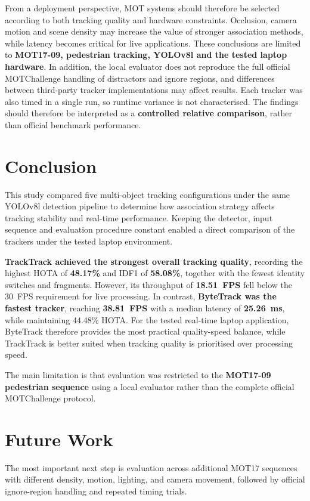 \documentclass[11pt,a4paper]{article}
\begin{document}
From a deployment perspective, MOT systems should therefore be selected according to both tracking quality and hardware constraints. Occlusion, camera motion and scene density may increase the value of stronger association methods, while latency becomes critical for live applications. These conclusions are limited to \textbf{MOT17-09, pedestrian tracking, YOLOv8l and the tested laptop hardware}. In addition, the local evaluator does not reproduce the full official MOTChallenge handling of distractors and ignore regions, and differences between third-party tracker implementations may affect results. Each tracker was also timed in a single run, so runtime variance is not characterised. The findings should therefore be interpreted as a \textbf{controlled relative comparison}, rather than official benchmark performance.

\section{Conclusion}

This study compared five multi-object tracking configurations under the same YOLOv8l detection pipeline to determine how association strategy affects tracking stability and real-time performance. Keeping the detector, input sequence and evaluation procedure constant enabled a direct comparison of the trackers under the tested laptop environment.

\textbf{TrackTrack achieved the strongest overall tracking quality}, recording the highest HOTA of \textbf{48.17\%} and IDF1 of \textbf{58.08\%}, together with the fewest identity switches and fragments. However, its throughput of \textbf{18.51~FPS} fell below the 30~FPS requirement for live processing. In contrast, \textbf{ByteTrack was the fastest tracker}, reaching \textbf{38.81~FPS} with a median latency of \textbf{25.26~ms}, while maintaining 44.48\% HOTA. For the tested real-time laptop application, ByteTrack therefore provides the most practical quality-speed balance, while TrackTrack is better suited when tracking quality is prioritised over processing speed.

The main limitation is that evaluation was restricted to the \textbf{MOT17-09 pedestrian sequence} using a local evaluator rather than the complete official MOTChallenge protocol.

\section{Future Work}

The most important next step is evaluation across additional MOT17 sequences with different density, motion, lighting, and camera movement, followed by official ignore-region handling and repeated timing trials.



\end{document}
